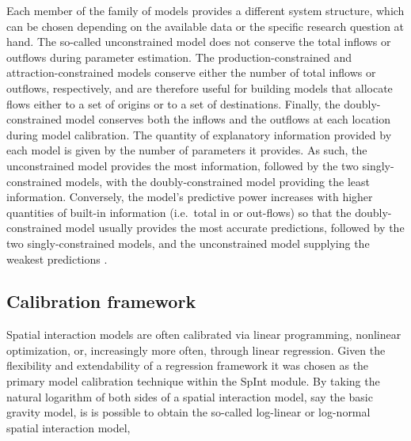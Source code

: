 \documentclass[11pt]{article}
\begin{document}
Each member of the family of models provides a different system
structure, which can be chosen depending on the available data or the
specific research question at hand. The so-called unconstrained model
does not conserve the total inflows or outflows during parameter
estimation. The production-constrained and attraction-constrained models
conserve either the number of total inflows or outflows, respectively,
and are therefore useful for building models that allocate flows either
to a set of origins or to a set of destinations. Finally, the
doubly-constrained model conserves both the inflows and the outflows at
each location during model calibration. The quantity of explanatory
information provided by each model is given by the number of parameters
it provides. As such, the unconstrained model provides the most
information, followed by the two singly-constrained models, with the
doubly-constrained model providing the least information. Conversely,
the model's predictive power increases with higher quantities of
built-in information (i.e.~total in or out-flows) so that the
doubly-constrained model usually provides the most accurate predictions,
followed by the two singly-constrained models, and the unconstrained
model supplying the weakest predictions \citep{fotheringham_spatial_1989}.

    \subsection{Calibration framework}\label{calibration-framework}

    Spatial interaction models are often calibrated via linear programming,
nonlinear optimization, or, increasingly more often, through linear
regression. Given the flexibility and extendability of a regression
framework it was chosen as the primary model calibration technique
within the SpInt module. By taking the natural logarithm of both sides
of a spatial interaction model, say the basic gravity model, is is
possible to obtain the so-called log-linear or log-normal spatial
interaction model,
\end{document}
